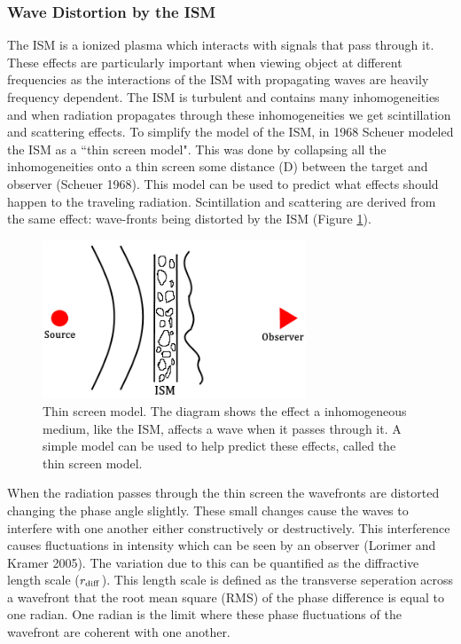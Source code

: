 \documentclass[10pt,a4paper]{article}
\begin{document}
\subsubsection{Wave Distortion by the ISM}\label{ISM}
The ISM is a ionized plasma which interacts with signals that pass through it. These effects are particularly important when viewing object at different frequencies as the interactions of the ISM with propagating waves are heavily frequency dependent. The ISM is turbulent and contains many inhomogeneities and when radiation propagates through these inhomogeneities we get scintillation and scattering effects.
To simplify the model of the ISM, in 1968 Scheuer modeled the ISM as a ``thin screen model". This was done by collapsing all the inhomogeneities onto a thin screen some distance (D) between the target and observer (Scheuer 1968). This model can be used to predict what effects should happen to the traveling radiation. Scintillation and scattering are derived from the same effect: wave-fronts being distorted by the ISM (Figure \ref{path}).
\begin{figure}[H]
    \centering 
    \includegraphics[width=0.7\textwidth]{thinscreen}
    \caption{Thin screen model. The diagram shows the effect a inhomogeneous medium, like the ISM, affects a wave when it passes through it. A simple model can be used to help predict these effects, called the thin screen model.}
    \label{path}
\end{figure}

When the radiation passes through the thin screen the wavefronts are distorted changing the phase angle slightly. These small changes cause the waves to interfere with one another either constructively or destructively. This interference causes fluctuations in intensity which can be seen by an observer (Lorimer and Kramer 2005). The variation due to this can be quantified as the diffractive length scale ($r_{\ce{diff}}$). This length scale is defined as the transverse seperation across a wavefront that the root mean square (RMS) of the phase difference is equal to one radian. One radian is the limit where these phase fluctuations of the wavefront are coherent with one another.
\end{document}
